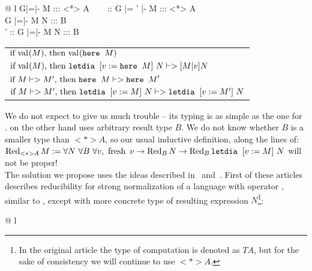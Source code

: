 \begin{center}
\footnotesize
\begin{tabular}{@{} l }
			     {G|=\Gamma |- \here M ::: <*> A} ~~~
			     {\Gamma :: G |= \Gamma' |- \here M ::: <*> A}\\[0.8cm]

	{G |=\Gamma |-  {} M N ::: B}\\[0.8cm]

	{\Gamma' :: G |=\Gamma |-  {} M N ::: B}
\end{tabular}
\end{center}
\begin{tabular}{ l }
$\mbox{\text{if}\ $\mbox{$\mathrm{val}_{}{(M)}$}$,\ \text{then}\ $\mbox{$\mathrm{val}_{}{(\mbox{$\operatorname{\texttt{here}}_{}\ {M}$})}$}$}$\\[0.5cm]

$\mbox{\text{if}\ $\mbox{$\mathrm{val}_{}{(M)}$}$,\ \text{then}\ $\mbox{$\operatorname{\texttt{letdia}}_{}\ {[{v}_{} := \mbox{$\operatorname{\texttt{here}}_{}\ {M}$}]}\ {N}$} |-> \mbox{$ [M | v] N$}$}$\\[0.1cm]
$\mbox{\text{if}\ $M|-> M'$,\ \text{then}\ $\mbox{$\operatorname{\texttt{here}}_{}\ {M}$} |-> \mbox{$\operatorname{\texttt{here}}_{}\ {M}$}'$}$\\[0.1cm]
$\mbox{\text{if}\ $M|-> M'$,\ \text{then}\ $\mbox{$\operatorname{\texttt{letdia}}_{}\ {[{v}_{} := M]}\ {N}$} |->\mbox{$\operatorname{\texttt{letdia}}_{}\ {[{v}_{} := M']}\ {N}$}$}$\\[0.1cm]
\end{tabular}

We do not expect \heree{} to give us much trouble -- its typing is as simple as the one for \unboxe{}.  on the other hand uses arbitrary result type $B$. We do not know whether $B$ is a smaller type than $<*>A$, so our usual inductive definition, along the lines of:\\
 $\Red{M}{<*>A} := \forall{N} \ \forall{B}\ \forall{v},\ \fresh{v} -> \Red{N}{B} -> \Red{\letdia{v}{}{M}{N}}{B}$
will not be proper!\\

The solution we propose uses the ideas described in~\cite{modalnormalization} and~\cite{contextmabi}. First of these articles describes reducibility for strong normalization of a language with operator , similar to , except with more concrete type of resulting expression $N$\footnote{In the original article the type of computation is denoted as $T A$, but for the sake of consistency we will continue to use $<*>A$.}:
\begin{center}
\footnotesize
\begin{tabular}{@{} l }
\\
\end{tabular}
\end{center}


